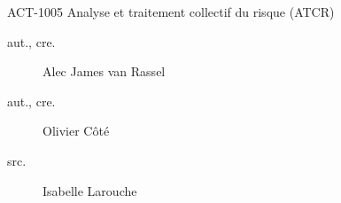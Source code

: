 \begin{contrib}{ACT-1005\: Analyse et traitement collectif du risque (ATCR)}
\begin{description}
	\item[aut., cre.] Alec James van Rassel
	\item[aut., cre.]	Olivier Côté
	\item[src.]	Isabelle Larouche
\end{description}
\end{contrib}